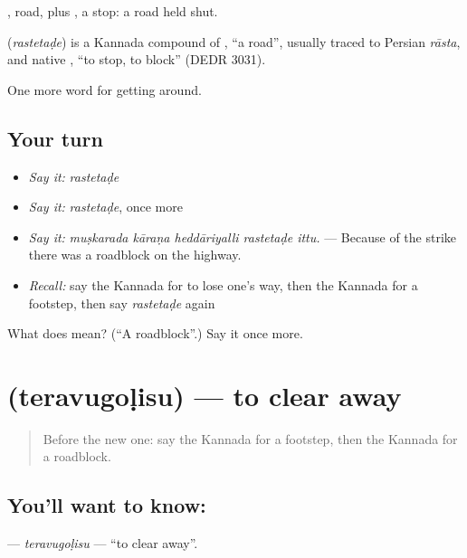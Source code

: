 , road, plus , a stop: a road held shut.

\begin{cousinweb}
\textbf{} (\emph{rastetaḍe}) is a Kannada compound of , \textquotedblleft{}a road\textquotedblright{}, usually traced to Persian \emph{rāsta}, and native , \textquotedblleft{}to stop, to block\textquotedblright{} (DEDR 3031).
\end{cousinweb}

\begin{grammarlens}[title={What you've built}]
One more word for getting around.
\end{grammarlens}

\subsection*{Your turn}
\begin{itemize}
\raggedright
  \item \emph{Say it:} \emph{rastetaḍe}
  \item \emph{Say it:} \emph{rastetaḍe}, once more
  \item \emph{Say it:} \emph{muṣkarada kāraṇa heddāriyalli rastetaḍe ittu.} — Because of the strike there was a roadblock on the highway.
  \item \emph{Recall:} say the Kannada for to lose one's way, then the Kannada for a footstep, then say \emph{rastetaḍe} again
\end{itemize}

\begin{tcolorbox}[breakable,colback=teal!4,colframe=teal!35!black,title={Before you move on}]
What does  mean? (\textquotedblleft{}A roadblock\textquotedblright{}.) Say it once more.
\end{tcolorbox}
\section[\texorpdfstring{\kn{ತೆರವುಗೊಳಿಸು} (teravugoḷisu)}{ತೆರವುಗೊಳಿಸು (teravugoḷisu)}]{ (teravugoḷisu) — to clear away}

\label{lesson:KA-C447-teravugolisu}



\begin{quote}
Before the new one: say the Kannada for a footstep, then the Kannada for a roadblock.
\end{quote}

\subsection*{You'll want to know: }
\textbf{} — \emph{teravugoḷisu} — \textquotedblleft{}to clear away\textquotedblright{}.

